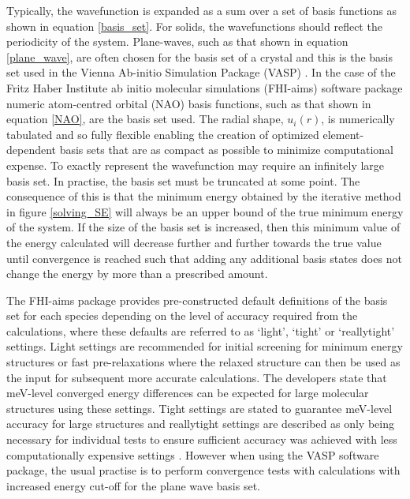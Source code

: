 Typically, the wavefunction is expanded as a sum over a set of basis functions as shown in equation \ref{basis_set}.
For solids, the wavefunctions should reflect the periodicity of the system. Plane-waves, such as that shown in equation \ref{plane_wave}, are often chosen for the basis set of a crystal and this is the basis set used in the Vienna Ab-initio Simulation Package (VASP) \cite{VASP}. In the case of the Fritz Haber Institute ab initio molecular simulations (FHI-aims) software package numeric atom-centred orbital (NAO) basis functions, such as that shown in equation \ref{NAO}, are the basis set used. The radial shape, $u_i(r)$, is numerically tabulated and so fully flexible enabling the creation of optimized element-dependent basis sets that are as compact as possible to minimize computational expense. 
To exactly represent the wavefunction may require an infinitely large basis set. In practise, the basis set must be truncated at some point. The consequence of this is that the minimum energy obtained by the iterative method in figure \ref{solving_SE} will always be an upper bound of the true minimum energy of the system. If the size of the basis set is increased, then this minimum value of the energy calculated will decrease further and further towards the true value until convergence is reached such that adding any additional basis states does not change the energy by more than a prescribed amount. 

The FHI-aims package provides pre-constructed default definitions of the basis set for each species depending on the level of accuracy required from the calculations, where these defaults are referred to as `light', `tight' or `really{\textunderscore}tight' settings. Light settings are recommended for initial screening for minimum energy structures or fast pre-relaxations where the relaxed structure can then be used as the input for subsequent more accurate calculations. The developers state that meV-level converged energy differences can be expected for large molecular structures using these settings. Tight settings are stated to guarantee meV-level accuracy for large structures and really{\textunderscore}tight settings are described as only being necessary for individual tests to ensure sufficient accuracy was achieved with less computationally expensive settings \cite{aims}. However when using the VASP software package, the usual practise is to perform convergence tests with calculations with increased energy cut-off for the plane wave basis set.


